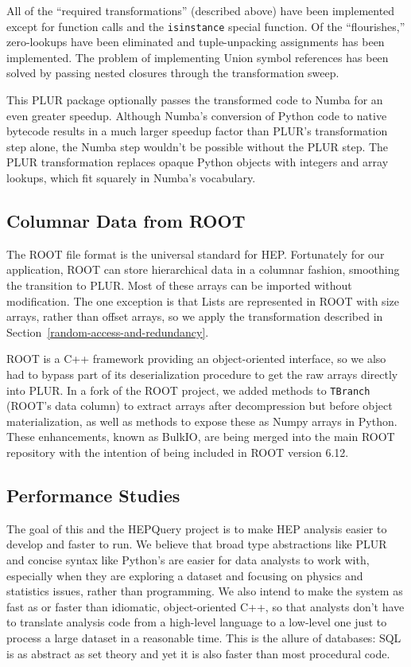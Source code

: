 \documentclass[10pt, conference, compsocconf]{IEEEtran}
\begin{document}
All of the ``required transformations'' (described above) have been implemented except for function calls and the {\tt isinstance} special function. Of the ``flourishes,'' zero-lookups have been eliminated and tuple-unpacking assignments has been implemented. The problem of implementing Union symbol references has been solved by passing nested closures through the transformation sweep.

This PLUR package optionally passes the transformed code to Numba\cite{numba} for an even greater speedup. Although Numba's conversion of Python code to native bytecode results in a much larger speedup factor than PLUR's transformation step alone, the Numba step wouldn't be possible without the PLUR step. The PLUR transformation replaces opaque Python objects with integers and array lookups, which fit squarely in Numba's vocabulary.

\subsection{Columnar Data from ROOT}

The ROOT file format is the universal standard for HEP. Fortunately for our application, ROOT can store hierarchical data in a columnar fashion, smoothing the transition to PLUR. Most of these arrays can be imported without modification. The one exception is that Lists are represented in ROOT with size arrays, rather than offset arrays, so we apply the transformation described in Section~\ref{random-access-and-redundancy}.

ROOT is a C++ framework providing an object-oriented interface, so we also had to bypass part of its deserialization procedure to get the raw arrays directly into PLUR. In a fork of the ROOT project\cite{bulkio}, we added methods to {\tt TBranch} (ROOT's data column) to extract arrays after decompression but before object materialization, as well as methods to expose these as Numpy arrays in Python. These enhancements, known as BulkIO, are being merged into the main ROOT repository with the intention of being included in ROOT version 6.12.

\subsection{Performance Studies}

The goal of this and the HEPQuery project is to make HEP analysis easier to develop and faster to run. We believe that broad type abstractions like PLUR and concise syntax like Python's are easier for data analysts to work with, especially when they are exploring a dataset and focusing on physics and statistics issues, rather than programming. We also intend to make the system as fast as or faster than idiomatic, object-oriented C++, so that analysts don't have to translate analysis code from a high-level language to a low-level one just to process a large dataset in a reasonable time. This is the allure of databases: SQL is as abstract as set theory and yet it is also faster than most procedural code.
\end{document}
